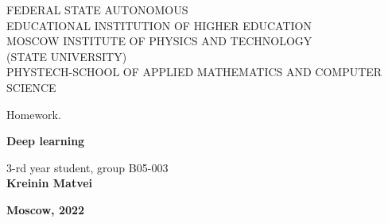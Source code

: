 \begin{center}
	\hfill \break
	\hfill \break	
	FEDERAL STATE AUTONOMOUS \\
    EDUCATIONAL INSTITUTION OF HIGHER EDUCATION \\
    MOSCOW INSTITUTE OF PHYSICS AND TECHNOLOGY \\
    (STATE UNIVERSITY) \\
    PHYSTECH-SCHOOL OF APPLIED MATHEMATICS AND COMPUTER SCIENCE\\

	\hfill \break

	Homework.
	
	\vspace{7em}
	
	\vspace{7em}
	\large{\textbf{Deep learning}}\\

\end{center}

\vspace{13em}

\begin{flushright}
	\normalsize{3-rd year student, group B05-003}\\
	\normalsize{\textbf{Kreinin Matvei}}\\
\end{flushright}


\begin{center}
	\normalsize{\textbf{Moscow, 2022}}
\end{center}


\thispagestyle{empty}
\setcounter{page}{0}

